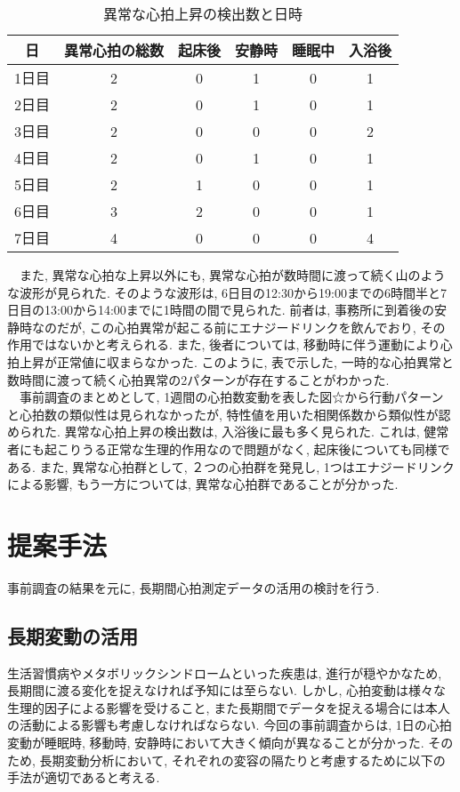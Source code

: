 \documentclass[report, 11pt, a4paper]{jsbook}
\begin{document}
\begin{table}[H]
\centering
\caption{異常な心拍上昇の検出数と日時}
\begin{tabular}{cccccc}
\hline
日  & 異常心拍の総数 & 起床後 & 安静時 & 睡眠中 & 入浴後 \\ \hline
1日目 & 2       & 0   & 1   & 0   & 1   \\
2日目 & 2       & 0   & 1   & 0   & 1   \\
3日目 & 2       & 0   & 0   & 0   & 2   \\
4日目 & 2       & 0   & 1   & 0   & 1   \\
5日目 & 2       & 1   & 0   & 0   & 1   \\
6日目 & 3       & 2   & 0   & 0   & 1   \\
7日目 & 4       & 0   & 0   & 0   & 4   \\ \hline
\end{tabular}
\end{table}

　また, 異常な心拍な上昇以外にも, 異常な心拍が数時間に渡って続く山のような波形が見られた. そのような波形は, 6日目の12:30から19:00までの6時間半と7日目の13:00から14:00までに1時間の間で見られた. 前者は, 事務所に到着後の安静時なのだが, この心拍異常が起こる前にエナジードリンクを飲んでおり, その作用ではないかと考えられる. また, 後者については, 移動時に伴う運動により心拍上昇が正常値に収まらなかった. このように, 表で示した, 一時的な心拍異常と数時間に渡って続く心拍異常の2パターンが存在することがわかった.\\
　事前調査のまとめとして, 1週間の心拍数変動を表した図☆から行動パターンと心拍数の類似性は見られなかったが, 特性値を用いた相関係数から類似性が認められた. 
異常な心拍上昇の検出数は, 入浴後に最も多く見られた. これは, 健常者にも起こりうる正常な生理的作用なので問題がなく, 起床後についても同様である. また, 異常な心拍群として, ２つの心拍群を発見し, 1つはエナジードリンクによる影響, もう一方については, 異常な心拍群であることが分かった. 
　

\chapter{提案手法}
事前調査の結果を元に, 長期間心拍測定データの活用の検討を行う. 

\section{長期変動の活用}
生活習慣病やメタボリックシンドロームといった疾患は, 進行が穏やかなため, 長期間に渡る変化を捉えなければ予知には至らない. しかし, 心拍変動は様々な生理的因子による影響を受けること, また長期間でデータを捉える場合には本人の活動による影響も考慮しなければならない. 今回の事前調査からは, 1日の心拍変動が睡眠時, 移動時, 安静時において大きく傾向が異なることが分かった. そのため, 長期変動分析において, それぞれの変容の隔たりと考慮するために以下の手法が適切であると考える.
\end{document}
